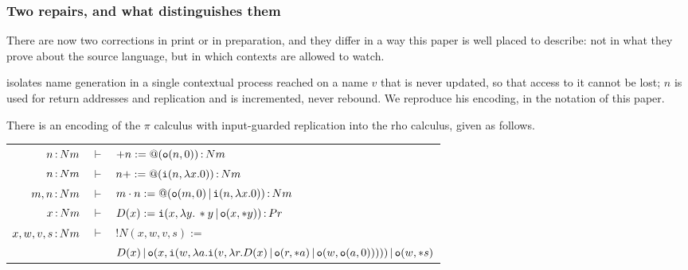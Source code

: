 \documentclass{article}
\begin{document}
\subsubsection*{Two repairs, and what distinguishes them}

There are now two corrections in print or in preparation, and they differ in a way this paper is well placed to describe: not in what they prove about the source language, but in which contexts are allowed to watch.

\citet{lybech} isolates name generation in a single contextual process reached on a name $v$ that is never updated, so that access to it cannot be lost; $n$ is used for return addresses and replication and is incremented, never rebound. We reproduce his encoding, in the notation of this paper.

\begin{theorem}
\label{thm:pirho}
    There is an encoding of the $\pi$ calculus with input-guarded replication into the rho calculus, given as follows.
    \begin{center}
    \renewcommand{\arraystretch}{1.2}
    \begin{tabular}{rcl}
        $n\,{:}\, Nm$ & $\vdash$ & $+n := @(\mathtt{o}(n,0))\,{:}\, Nm$\\
        $n\,{:}\, Nm$ & $\vdash$ & $n+ := @(\mathtt{i}(n,\lambda x.0))\,{:}\, Nm$\\
        $m,n\,{:}\, Nm$ & $\vdash$ & $m\cdot n := @(\mathtt{o}(m,0)\,|\, \mathtt{i}(n,\lambda x.0))\,{:}\, Nm$\\
        $x\,{:}\, Nm$ & $\vdash$ & $D(x) := \mathtt{i}(x,\lambda y.\, \ast y \,|\, \mathtt{o}(x,\ast y))\,{:}\, Pr$\\
        $x,w,v,s\,{:}\, Nm$ & $\vdash$ & $!N(x,w,v,s) :=$\\
        && $D(x)\,|\, \mathtt{o}(x,\mathtt{i}(w,\lambda a. \mathtt{i}(v, \lambda r. D(x)\,|\, \mathtt{o}(r,\ast a)\,|\, \mathtt{o}(w, \mathtt{o}(a,0)))))\,|\, \mathtt{o}(w,\ast s)$
    \end{tabular}
    \end{center}


\end{theorem}
\end{document}
